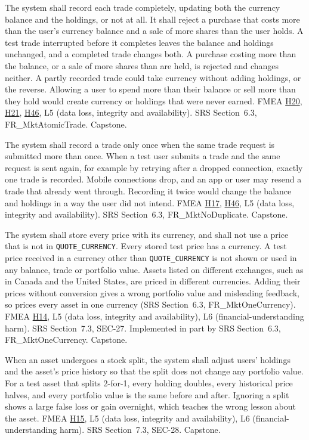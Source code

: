\documentclass{article}
\newcommand{\hazref}[1]{\hyperref[#1]{#1}}
\begin{document}
\begin{description}
{The system shall record each trade completely, updating both the currency
balance and the holdings, or not at all. It shall reject a purchase that costs
more than the user's currency balance and a sale of more shares than the user
holds.}
{A test trade interrupted before it completes leaves the balance and holdings
unchanged, and a completed trade changes both. A purchase costing more than the
balance, or a sale of more shares than are held, is rejected and changes
neither.}
{A partly recorded trade could take currency without adding holdings, or the
reverse. Allowing a user to spend more than their balance or sell more than
they hold would create currency or holdings that were never earned.}
{FMEA \hazref{H20}, \hazref{H21}, \hazref{H46}, L5 (data loss, integrity and availability).}
{SRS Section~6.3, FR\_MktAtomicTrade.}
{Capstone.}

{The system shall record a trade only once when the same trade request is
submitted more than once.}
{When a test user submits a trade and the same request is sent again, for
example by retrying after a dropped connection, exactly one trade is recorded.}
{Mobile connections drop, and an app or user may resend a trade that already
went through. Recording it twice would change the balance and holdings in a way
the user did not intend.}
{FMEA \hazref{H17}, \hazref{H46}, L5 (data loss, integrity and availability).}
{SRS Section~6.3, FR\_MktNoDuplicate.}
{Capstone.}


{The system shall store every price with its currency, and shall not use a
price that is not in \texttt{QUOTE\_CURRENCY}.}
{Every stored test price has a currency. A test price received in a currency
other than \texttt{QUOTE\_CURRENCY} is not shown or used in any balance, trade
or portfolio value.}
{Assets listed on different exchanges, such as in Canada and the United
States, are priced in different currencies. Adding their prices without
conversion gives a wrong portfolio value and misleading feedback, so
\progname{} prices every asset in one currency (SRS Section~6.3,
FR\_MktOneCurrency).}
{FMEA \hazref{H14}, L5 (data loss, integrity and availability), L6 (financial-understanding harm).}
{SRS Section~7.3, SEC-27. Implemented in part by SRS Section~6.3,
FR\_MktOneCurrency.}
{Capstone.}

{When an asset undergoes a stock split, the system shall adjust users'
holdings and the asset's price history so that the split does not change any
portfolio value.}
{For a test asset that splits 2-for-1, every holding doubles, every historical
price halves, and every portfolio value is the same before and after.}
{Ignoring a split shows a large false loss or gain overnight, which teaches the
wrong lesson about the asset.}
{FMEA \hazref{H15}, L5 (data loss, integrity and availability), L6 (financial-understanding harm).}
{SRS Section~7.3, SEC-28.}
{Capstone.}


\end{description}
\end{document}
